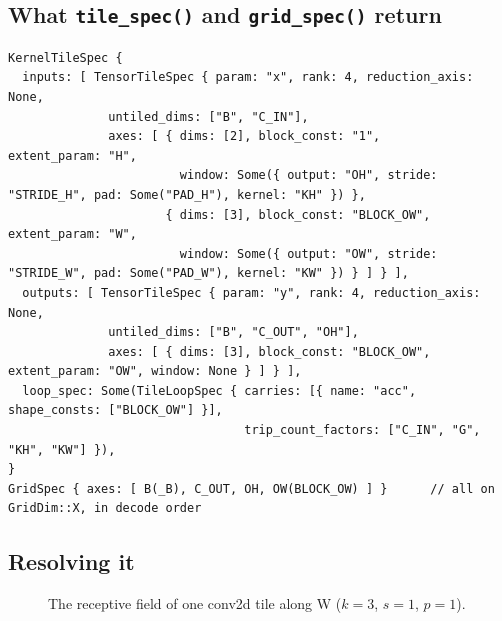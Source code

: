 \subsection{What \texttt{tile\_spec()} and \texttt{grid\_spec()} return}

\begin{lstlisting}
KernelTileSpec {
  inputs: [ TensorTileSpec { param: "x", rank: 4, reduction_axis: None,
              untiled_dims: ["B", "C_IN"],
              axes: [ { dims: [2], block_const: "1",        extent_param: "H",
                        window: Some({ output: "OH", stride: "STRIDE_H", pad: Some("PAD_H"), kernel: "KH" }) },
                      { dims: [3], block_const: "BLOCK_OW", extent_param: "W",
                        window: Some({ output: "OW", stride: "STRIDE_W", pad: Some("PAD_W"), kernel: "KW" }) } ] } ],
  outputs: [ TensorTileSpec { param: "y", rank: 4, reduction_axis: None,
              untiled_dims: ["B", "C_OUT", "OH"],
              axes: [ { dims: [3], block_const: "BLOCK_OW", extent_param: "OW", window: None } ] } ],
  loop_spec: Some(TileLoopSpec { carries: [{ name: "acc", shape_consts: ["BLOCK_OW"] }],
                                 trip_count_factors: ["C_IN", "G", "KH", "KW"] }),
}
GridSpec { axes: [ B(_B), C_OUT, OH, OW(BLOCK_OW) ] }      // all on GridDim::X, in decode order
\end{lstlisting}

\subsection{Resolving it}

\begin{figure}[h]
\centering
{}
\caption{The receptive field of one conv2d tile along W ($k=3$, $s=1$, $p=1$).}
\label{fig:window}
\end{figure}

